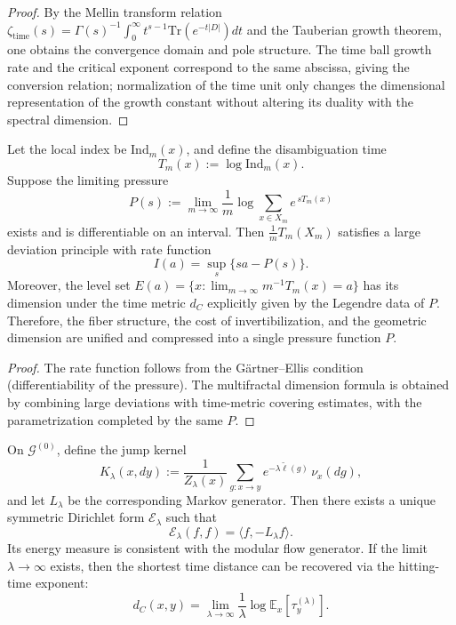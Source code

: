 \begin{proof}
By the Mellin transform relation
\(
\zeta_{\mathrm{time}}(s)=\Gamma(s)^{-1}\int_0^\infty t^{s-1}\mathrm{Tr}(e^{-t|D|})dt
\)
and the Tauberian growth theorem, one obtains the convergence domain and pole structure.
The time ball growth rate and the critical exponent correspond to the same abscissa, giving the conversion relation; normalization of the time unit only changes the dimensional representation of the growth constant without altering its duality with the spectral dimension.
\end{proof}



\begin{theorem}\label{thm:xi-fiber-time-multifractal-legendre}
Let the local index be \(\mathrm{Ind}_m(x)\), and define the disambiguation time
\[
T_m(x):=\log \mathrm{Ind}_m(x).
\]
Suppose the limiting pressure
\[
P(s):=\lim_{m\to\infty}\frac1m\log\sum_{x\in X_m}e^{\,sT_m(x)}
\]
exists and is differentiable on an interval.
Then \(\frac1mT_m(X_m)\) satisfies a large deviation principle with rate function
\[
I(a)=\sup_s\{sa-P(s)\}.
\]
Moreover, the level set
\(
E(a)=\{x:\lim_{m\to\infty}m^{-1}T_m(x)=a\}
\)
has its dimension under the time metric \(d_C\) explicitly given by the Legendre data of \(P\).
Therefore, the fiber structure, the cost of invertibilization, and the geometric dimension are unified and compressed into a single pressure function \(P\).
\end{theorem}

\begin{proof}
The rate function follows from the G\"artner--Ellis condition (differentiability of the pressure).
The multifractal dimension formula is obtained by combining large deviations with time-metric covering estimates, with the parametrization completed by the same \(P\).
\end{proof}

\begin{theorem}\label{thm:xi-time-induced-dirichlet-form}
On \(\mathcal G^{(0)}\), define the jump kernel
\[
K_\lambda(x,dy)
:=
\frac{1}{Z_\lambda(x)}
\sum_{g:x\to y}
e^{-\lambda\widetilde\ell(g)}\,\nu_x(dg),
\]
and let \(L_\lambda\) be the corresponding Markov generator.
Then there exists a unique symmetric Dirichlet form \(\mathcal E_\lambda\) such that
\[
\mathcal E_\lambda(f,f)=\langle f,-L_\lambda f\rangle.
\]
Its energy measure is consistent with the modular flow generator.
If the limit \(\lambda\to\infty\) exists, then the shortest time distance can be recovered via the hitting-time exponent:
\[
d_C(x,y)
=
\lim_{\lambda\to\infty}
\frac{1}{\lambda}\log\mathbb E_x[\tau_y^{(\lambda)}].
\]
\end{theorem}

